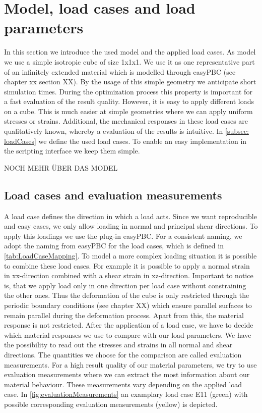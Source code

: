     \section{Model, load cases and load parameters}
    In this section we introduce the used model and the applied load cases. 
    As model we use a simple isotropic cube of size 1x1x1. We use it as one representative part of an infinitely extended material which is modelled through easyPBC (see chapter xx section XX). By the usage of this simple geometry we anticipate short simulation times. During the optimization process this property is important for a fast evaluation of the result quality.  However, it is easy to apply different loads on a cube. This is much easier at simple geometries where we can apply uniform stresses or strains. Additional, the mechanical responses in these load cases are qualitatively known, whereby a evaluation of the results is intuitive.
    In \autoref{subsec: loadCases} we define the used load cases. To enable an easy implementation in the  scripting interface we keep them simple. 
    
    
    NOCH MEHR ÜBER DAS MODEL
    
    \subsection{Load cases and evaluation measurements}\label{subsec: loadCases}
    
    A load case defines the direction in which a load acts. Since we want reproducible and easy cases, we only allow loading in normal and principal shear directions. To apply this loadings we use the  plug-in easyPBC. For a consistent naming, we adopt the naming from easyPBC for the load cases, which is defined in \autoref{tab:LoadCaseMapping}.
     To model a more complex loading situation it is possible to combine these load cases. For example it is possible to apply a normal strain in xx-direction combined with a shear strain in xz-direction. Important to notice is, that we apply load only in one direction per load case without constraining the other ones. Thus the deformation of the cube is only restricted through the periodic boundary conditions (see chapter XX) which ensure parallel surfaces to remain parallel during the deformation process. Apart from this, the material response is not restricted. After the application of a load case, we have to decide which material responses we use to compare with our load parameters. We have the possibility to read out the stresses and strains in all normal and shear directions. The quantities we choose for the comparison are called evaluation measurements.
     For a high result quality of our material parameters, we try to use evaluation measurements where we can extract the most information about our material behaviour. These measurements vary depending on the applied load case. In \autoref{fig:evaluationMeasurements} an examplary load case E11 (green) with possible corresponding evaluation measurements (yellow) is depicted.

